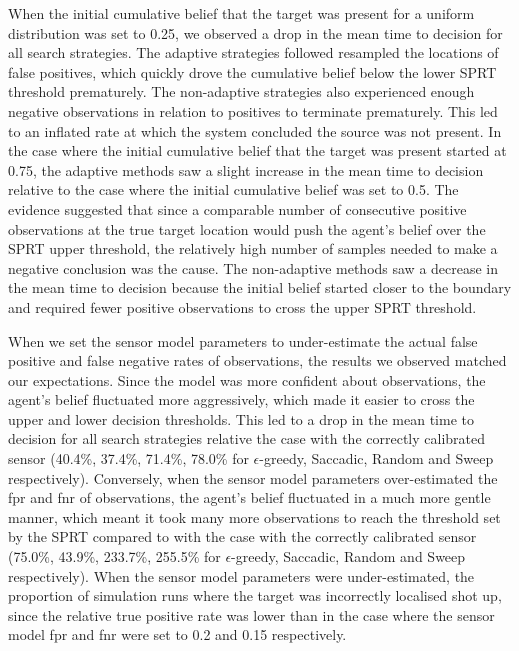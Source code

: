 When the initial cumulative belief that the target was present for a uniform distribution was set to 0.25, we observed a drop in the mean time to decision for all search strategies. The adaptive strategies followed resampled the locations of false positives, which quickly drove the cumulative belief below the lower SPRT threshold prematurely. The non-adaptive strategies also experienced enough negative observations in relation to positives to terminate prematurely. This led to an inflated rate at which the system concluded the source was not present. In the case where the initial cumulative belief that the target was present started at 0.75, the adaptive methods saw a slight increase in the mean time to decision relative to the case where the initial cumulative belief was set to 0.5. The evidence suggested that since a comparable number of consecutive positive observations at the true target location would push the agent's belief over the SPRT upper threshold, the relatively high number of samples needed to make a negative conclusion was the cause. The non-adaptive methods saw a decrease in the mean time to decision because the initial belief started closer to the boundary and required  fewer positive observations to cross the upper SPRT threshold.\par


When we set the sensor model parameters to under-estimate the actual false positive and false negative rates of observations, the results we observed matched our expectations. Since the model was more confident about observations, the agent's belief fluctuated more aggressively, which made it easier to cross the upper and lower decision thresholds. This led to a drop in the mean time to decision for all search strategies relative the case with the correctly calibrated sensor (40.4\%, 37.4\%, 71.4\%, 78.0\% for $\epsilon$-greedy, Saccadic, Random and Sweep respectively). Conversely, when the sensor model parameters over-estimated the fpr and fnr of observations, the agent's belief fluctuated in a much more gentle manner, which meant it took many more observations to reach the threshold set by the SPRT compared to with the case with the correctly calibrated sensor (75.0\%, 43.9\%, 233.7\%, 255.5\% for $\epsilon$-greedy, Saccadic, Random and Sweep respectively). When the sensor model parameters were under-estimated, the proportion of simulation runs where the target was incorrectly localised shot up, since the relative true positive rate was lower than in the case where the sensor model fpr and fnr were set to 0.2 and 0.15 respectively.\par

